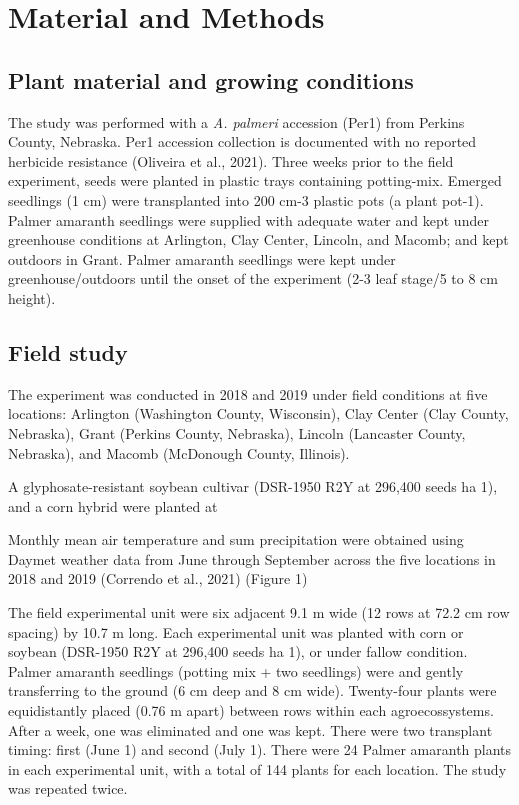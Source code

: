 \documentclass[utf8]{frontiersSCNS}
\begin{document}
\hypertarget{material-and-methods}{%
\section*{Material and Methods}\label{material-and-methods}}

\hypertarget{plant-material-and-growing-conditions}{%
\subsection*{Plant material and growing
conditions}\label{plant-material-and-growing-conditions}}

The study was performed with a \emph{A. palmeri} accession (Per1) from
Perkins County, Nebraska. Per1 accession collection is documented with
no reported herbicide resistance (Oliveira et al., 2021). Three weeks
prior to the field experiment, seeds were planted in plastic trays
containing potting-mix. Emerged seedlings (1 cm) were transplanted into
200 cm-3 plastic pots (a plant pot-1). Palmer amaranth seedlings were
supplied with adequate water and kept under greenhouse conditions at
Arlington, Clay Center, Lincoln, and Macomb; and kept outdoors in Grant.
Palmer amaranth seedlings were kept under greenhouse/outdoors until the
onset of the experiment (2-3 leaf stage/5 to 8 cm height).

\hypertarget{field-study}{%
\subsection*{Field study}\label{field-study}}

The experiment was conducted in 2018 and 2019 under field conditions at
five locations: Arlington (Washington County, Wisconsin), Clay Center
(Clay County, Nebraska), Grant (Perkins County, Nebraska), Lincoln
(Lancaster County, Nebraska), and Macomb (McDonough County, Illinois).

A glyphosate-resistant soybean cultivar (DSR-1950 R2Y at 296,400 seeds
ha 1), and a corn hybrid were planted at

Monthly mean air temperature and sum precipitation were obtained using
Daymet weather data from June through September across the five
locations in 2018 and 2019 (Correndo et al., 2021) (Figure 1)

The field experimental unit were six adjacent 9.1 m wide (12 rows at
72.2 cm row spacing) by 10.7 m long. Each experimental unit was planted
with corn or soybean (DSR-1950 R2Y at 296,400 seeds ha 1), or under
fallow condition. Palmer amaranth seedlings (potting mix + two
seedlings) were and gently transferring to the ground (6 cm deep and 8
cm wide). Twenty-four plants were equidistantly placed (0.76 m apart)
between rows within each agroecossystems. After a week, one was
eliminated and one was kept. There were two transplant timing: first
(June 1) and second (July 1). There were 24 Palmer amaranth plants in
each experimental unit, with a total of 144 plants for each location.
The study was repeated twice.
\end{document}
